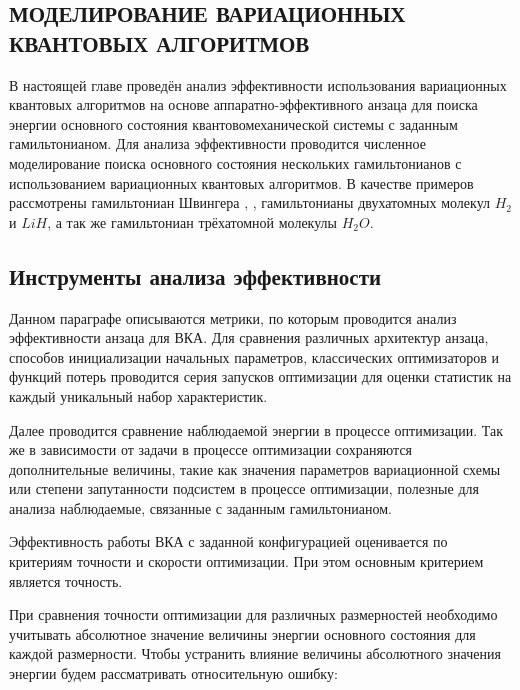 \documentclass[14pt]{extarticle}
\begin{document}
\newpage

\begin{center}
\section{МОДЕЛИРОВАНИЕ ВАРИАЦИОННЫХ КВАНТОВЫХ АЛГОРИТМОВ} \label{numerical_calculations}
\end{center}

\qquad В настоящей главе проведён анализ эффективности использования вариационных квантовых алгоритмов на основе аппаратно-эффективного анзаца для поиска энергии основного состояния квантовомеханической системы с заданным гамильтонианом. Для анализа эффективности проводится численное моделирование поиска основного состояния нескольких гамильтонианов с использованием вариационных квантовых алгоритмов. В качестве примеров рассмотрены гамильтониан Швингера \cite{Borzenkova_2021}, \cite{Buyens_2016}, гамильтонианы двухатомных молекул $H_2$ и $LiH$, а так же гамильтониан трёхатомной молекулы $H_2O$.


\subsection{Инструменты анализа эффективности}

\qquad Данном параграфе описываются метрики, по которым проводится анализ эффективности анзаца для ВКА. Для сравнения различных архитектур анзаца, способов инициализации начальных параметров, классических оптимизаторов и функций потерь проводится серия запусков оптимизации для оценки статистик на каждый уникальный набор характеристик.

\qquad Далее проводится сравнение наблюдаемой энергии в процессе оптимизации. Так же в зависимости от задачи в процессе оптимизации сохраняются дополнительные величины, такие как значения параметров вариационной схемы или степени запутанности подсистем в процессе оптимизации, полезные для анализа наблюдаемые, связанные с заданным гамильтонианом.

\qquad Эффективность работы ВКА с заданной конфигурацией оценивается по критериям  точности и скорости оптимизации. При этом основным критерием является точность.

\qquad При сравнения точности оптимизации для различных размерностей необходимо учитывать абсолютное значение величины энергии основного состояния для каждой размерности. Чтобы устранить влияние величины абсолютного значения энергии будем рассматривать относительную ошибку:
\end{document}
